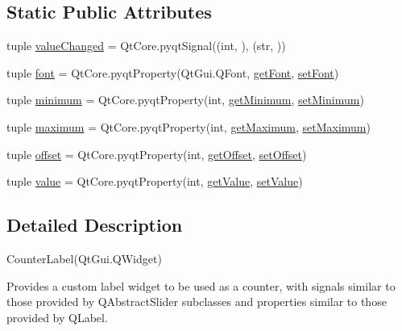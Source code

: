 \subsection*{Static Public Attributes}
\begin{DoxyCompactItemize}
\item 
tuple \hyperlink{classcounterlabel_1_1CounterLabel_a0e02a9f200c7d6256be3602423e3993c}{value\+Changed} = Qt\+Core.\+pyqt\+Signal((int, ), (str, ))
\item 
tuple \hyperlink{classcounterlabel_1_1CounterLabel_a9d7a72240db94ecae027781e1d87bde4}{font} = Qt\+Core.\+pyqt\+Property(Qt\+Gui.\+Q\+Font, \hyperlink{classcounterlabel_1_1CounterLabel_aea3cbf01dcee194e2ac891701b4d8d46}{get\+Font}, \hyperlink{classcounterlabel_1_1CounterLabel_ad2cf614d90cdd00fdf3dfe3ce1b1049f}{set\+Font})
\item 
tuple \hyperlink{classcounterlabel_1_1CounterLabel_a8739036557ffdbdd559a65a400d4684c}{minimum} = Qt\+Core.\+pyqt\+Property(int, \hyperlink{classcounterlabel_1_1CounterLabel_a941373cf7e9c62d47c48654c0065e22f}{get\+Minimum}, \hyperlink{classcounterlabel_1_1CounterLabel_ac1c15fa5b6661a9727bd3cae19ef23df}{set\+Minimum})
\item 
tuple \hyperlink{classcounterlabel_1_1CounterLabel_a86267d46fdd529d06c52de9766af21e9}{maximum} = Qt\+Core.\+pyqt\+Property(int, \hyperlink{classcounterlabel_1_1CounterLabel_a5237df8853658ca7d62448c57b6722fb}{get\+Maximum}, \hyperlink{classcounterlabel_1_1CounterLabel_acde9ac8afaca63af9091b644fb83f392}{set\+Maximum})
\item 
tuple \hyperlink{classcounterlabel_1_1CounterLabel_a0ded2704ed0052e09c70b762a3b306e9}{offset} = Qt\+Core.\+pyqt\+Property(int, \hyperlink{classcounterlabel_1_1CounterLabel_ac41b479286aa2357809ce1b4770124cf}{get\+Offset}, \hyperlink{classcounterlabel_1_1CounterLabel_a6a158fb27240367b213ee366d032f41b}{set\+Offset})
\item 
tuple \hyperlink{classcounterlabel_1_1CounterLabel_ad01646565864a58c8217eb5637ec625f}{value} = Qt\+Core.\+pyqt\+Property(int, \hyperlink{classcounterlabel_1_1CounterLabel_adb94f2fbf3b77a3e2aa95e308caa6548}{get\+Value}, \hyperlink{classcounterlabel_1_1CounterLabel_ab05b11305da39e15a9e7a533617395ef}{set\+Value})
\end{DoxyCompactItemize}


\subsection{Detailed Description}
\begin{DoxyVerb}CounterLabel(QtGui.QWidget)

Provides a custom label widget to be used as a counter, with signals
similar to those provided by QAbstractSlider subclasses and properties
similar to those provided by QLabel.
\end{DoxyVerb}
 

